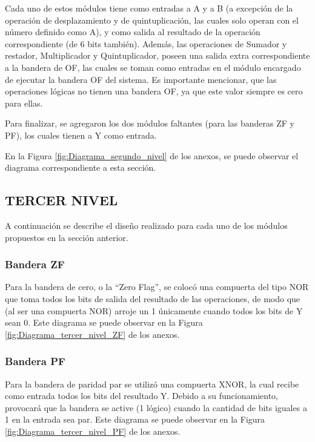 \documentclass[journal,trans]{IEEEtran}
\begin{document}
Cada uno de estos módulos tiene como entradas a A y a B (a excepción de la operación de desplazamiento y de quintuplicación, las cuales solo operan con el número definido como A), y como salida al resultado de la operación correspondiente (de 6 bits también). Además, las operaciones de Sumador y restador, Multiplicador y Quintuplicador, poseen una salida extra correspondiente a la bandera de OF, las cuales se toman como entradas en el módulo encargado de ejecutar la bandera OF del sistema. Es importante mencionar, que las operaciones lógicas no tienen una bandera OF, ya que este valor siempre es cero para ellas.

Para finalizar, se agregaron los dos módulos faltantes (para las banderas ZF y PF), los cuales tienen a Y como entrada.

En la Figura \ref{fig:Diagrama_segundo_nivel} de los anexos, se puede observar el diagrama correspondiente a esta sección.

\subsection{TERCER NIVEL}
A continuación se describe el diseño realizado para cada uno de los módulos propuestos en la sección anterior.

\subsubsection{Bandera ZF}
Para la bandera de cero, o la “Zero Flag”, se colocó una compuerta del tipo NOR que toma todos los bits de salida del resultado de las operaciones, de modo que (al ser una compuerta NOR) arroje un 1 únicamente cuando todos los bits de Y sean 0. Este diagrama se puede observar en la Figura \ref{fig:Diagrama_tercer_nivel_ZF} de los anexos.

\subsubsection{Bandera PF}
Para la bandera de paridad par se utilizó una compuerta XNOR, la cual recibe como entrada todos los bits del resultado Y. Debido a su funcionamiento, provocará que la bandera se active (1 lógico) cuando la cantidad de bits iguales a 1 en la entrada sea par. Este diagrama se puede observar en la Figura \ref{fig:Diagrama_tercer_nivel_PF} de los anexos.
\end{document}

